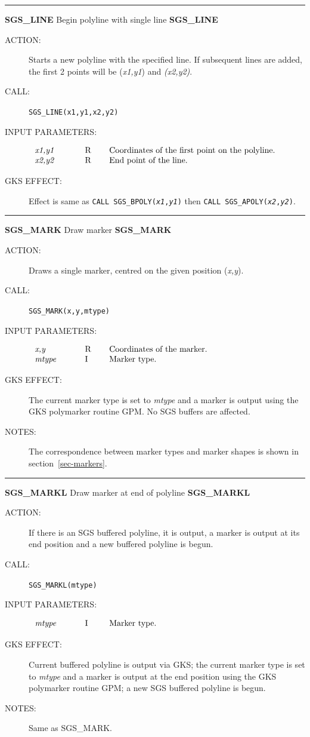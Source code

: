 \documentclass[11pt]{article}
\newcommand{\hyperref}[4]{#2\ref{#4}#3}
\newcommand{\xlabel}[1]{}
\newcommand{\rthead}[2]{\rule{\textwidth}{0.3mm}
{\Large {\bf #1} \hfill #2 \hfill {\bf #1}}}
\newenvironment{params}%
{\[\begin{tabular}{p{0.14\textwidth}p{0.05\textwidth}p{0.66\textwidth}}}%
{\end{tabular}\]}
\newcommand{\rparams}[3]{{\em #1} &#2 &#3\\}
\newcommand{\rthead}[2]{\subsection{\label{#1}\xlabel{#1}#1 - #2}}
\newenvironment{params}{\begin{description}}{\end{description}}
\newcommand{\rparams}[3]{\item{{\em #1}} (#2) #3}
\begin{document}
\rthead{SGS\_LINE}{Begin polyline with single line}
\begin{description}
\item [ACTION:]
Starts a new polyline with the specified line.
If subsequent lines are added, the first 2 points will be ({\em x1,y1}) and
{\em (x2,y2)}.
\item [CALL:]
{\tt SGS\_LINE(x1,y1,x2,y2)}
\item [INPUT PARAMETERS:]
\begin{params}
\rparams{x1,y1}{R}{Coordinates of the first point on the polyline.}
\rparams{x2,y2}{R}{End point of the line.}
\end{params}
\item [GKS EFFECT:]
Effect is same as {\tt CALL SGS\_BPOLY({\em x1},{\em y1})} then {\tt CALL
SGS\_APOLY({\em x2},{\em y2})}.
\end{description}
\goodbreak

\rthead{SGS\_MARK}{Draw marker}
\begin{description}
\item [ACTION:]
Draws a single marker, centred on the given position ({\em x,y}).
\item [CALL:]
{\tt SGS\_MARK(x,y,mtype)}
\item [INPUT PARAMETERS:]
\begin{params}
\rparams{x,y}{R}{Coordinates of the marker.}
\rparams{mtype}{I}{Marker type.}
\end{params}
\item [GKS EFFECT:]
The current marker type is set to {\em mtype}\/ and a marker is output using the
GKS polymarker routine GPM.
No SGS buffers are affected.
\item [NOTES:]
The correspondence between marker types and marker shapes is shown in
\hyperref{this section}{section~}{}{sec-markers}.
\end{description}
\goodbreak

\rthead{SGS\_MARKL}{Draw marker at end of polyline}
\begin{description}
\item [ACTION:]
If there is an SGS buffered polyline, it is output, a marker is output at its
end position and a new buffered polyline is begun.
\item [CALL:]
{\tt SGS\_MARKL(mtype)}
\item [INPUT PARAMETERS:]
\begin{params}
\rparams{mtype}{I}{Marker type.}
\end{params}
\item [GKS EFFECT:]
Current buffered polyline is output via GKS; the current marker type is set to
{\em mtype}\/ and a marker is output at the end position using the GKS polymarker
routine GPM; a new SGS buffered polyline is begun.
\item [NOTES:]
Same as SGS\_MARK.
\end{description}
\goodbreak
\end{document}
